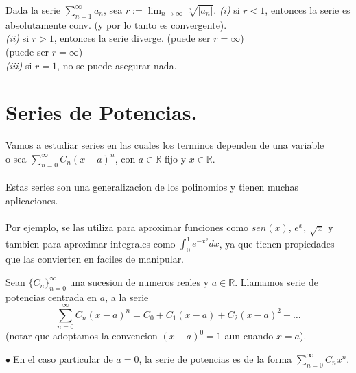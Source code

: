 \documentclass{article}
\theoremstyle{definition}
\theoremstyle{remark}
\newcommand\bl{$\bullet\;$}
\begin{document}
\begin{teo} Dada la serie $\sum_{n=1}^{\infty}{a_n}$, sea $r:=\lim_{n\to\infty}{\sqrt[n]{|a_n|}}.$
  \emph{(i)\phantom{ii}} \quad si $r<1$, entonces la serie es absolutamente conv. (y por lo tanto es convergente). \\
  \emph{(ii)\phantom{i}} \quad si $r>1$, entonces la serie diverge. (puede ser $r=\infty$)\\(puede ser $r=\infty$) \\
  \emph{(iii)} \quad si $r=1$, no se puede asegurar nada.
\end{teo}

\section{Series de Potencias.}

Vamos a estudiar series en las cuales los terminos dependen de una variable \\ o sea $\sum_{n=0}^{\infty}{C_n (x-a)^n}$, con $a \in \mathbb{R}$ fijo y $x \in \mathbb{R}$.
\\\\
Estas series son una generalizacion de los polinomios y tienen muchas aplicaciones.
\\\\
Por ejemplo, se las utiliza para aproximar funciones como $sen(x)$, $e^x$, $\sqrt{x}$ y tambien para aproximar integrales como $\int_{0}^{1}{e^{-x^2}dx}$, ya que tienen propiedades que las convierten en faciles de manipular.
\pagebreak 
\begin{defi}
  Sean $\{C_n\}_{n=0}^{\infty}$ una sucesion de numeros reales y $a \in \mathbb{R}$. Llamamos serie de potencias centrada en $a$, a la serie 
  \[ 
  \sum_{n=0}^{\infty}{C_n(x-a)^n} = C_0+C_1(x-a)+C_2(x-a)^2+\dots 
  \]
  (notar que adoptamos la convencion $(x-a)^0=1$ aun cuando $x=a$).
\end{defi}
\bl En el caso particular de $a=0$, la serie de potencias es de la forma $\sum_{n=0}^{\infty}{C_nx^n}$. 
\end{document}
